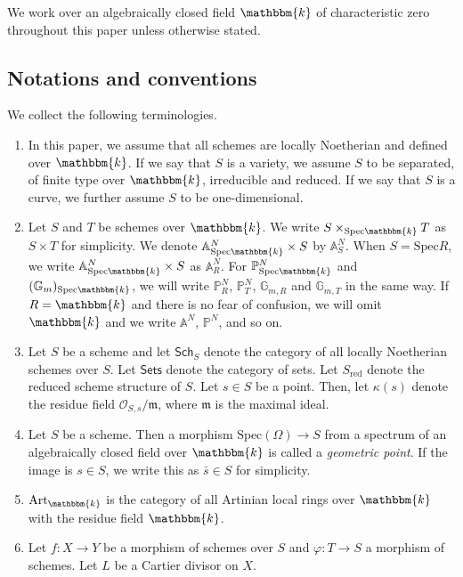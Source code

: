 \documentclass[12pt,twoside]{amsart}
\theoremstyle{definition}
\begin{document}
We work over an algebraically closed field $\mathbbm{k}$ of characteristic zero throughout this paper unless otherwise stated.

\subsection*{Notations and conventions} We collect the following terminologies. 
\begin{enumerate}
\item In this paper, we assume that all schemes are locally Noetherian and defined over $\mathbbm{k}$.
If we say that $S$ is a variety, we assume $S$ to be separated, of finite type over $\mathbbm{k}$, irreducible and reduced.
If we say that $S$ is a curve, we further assume $S$ to be one-dimensional.
\item Let $S$ and $T$ be schemes over $\mathbbm{k}$.
We write $S\times_{\mathrm{Spec}\mathbbm{k}}T$ as $S\times T$ for simplicity. 
We denote $\mathbb{A}^N_{\mathrm{Spec}\mathbbm{k}}\times S$ by $\mathbb{A}^N_{S}$. 
When $S=\mathrm{Spec}R$, we write $\mathbb{A}^N_{\mathrm{Spec}\mathbbm{k}}\times S$ as $\mathbb{A}^N_{R}$.
For $\mathbb{P}^N_{\mathrm{Spec}\mathbbm{k}}$ and $(\mathbb{G}_m)_{\mathrm{Spec}\mathbbm{k}}$, we will write $\mathbb{P}^N_{R}$,  $\mathbb{P}^N_{T}$, $\mathbb{G}_{m,R}$ and $\mathbb{G}_{m,T}$ in the same way.
If $R=\mathbbm{k}$ and there is no fear of confusion, we will omit $\mathbbm{k}$ and we write $\mathbb{A}^N$, $\mathbb{P}^N$, and so on.
    \item Let $S$ be a scheme and let $\mathsf{Sch}_S$ denote the category of all locally Noetherian schemes over $S$.
    Let $\mathsf{Sets}$ denote the category of sets.
    Let $S_{\mathrm{red}}$ denote the reduced scheme structure of $S$.
    Let $s\in S$ be a point.
    Then, let $\kappa(s)$ denote the residue field $\mathcal{O}_{S,s}/\mathfrak{m}$, where $\mathfrak{m}$ is the maximal ideal.
    \item Let $S$ be a scheme. Then a morphism $\mathrm{Spec}(\Omega)\to S$ from a spectrum of an algebraically closed field over $\mathbbm{k}$ is called a {\it geometric point}.
    If the image is $s\in S$, we write this as $\bar{s}\in S$ for simplicity.
    \item $\mathrm{Art}_{\mathbbm{k}}$ is the category of all Artinian local rings over $\mathbbm{k}$ with the residue field $\mathbbm{k}$. 
    \item Let $f\colon X\to Y$ be a morphism of schemes over $S$ and $\varphi\colon T\to S$ a morphism of schemes. 
    Let $L$ be a Cartier divisor on $X$. 

\end{enumerate}
\end{document}
